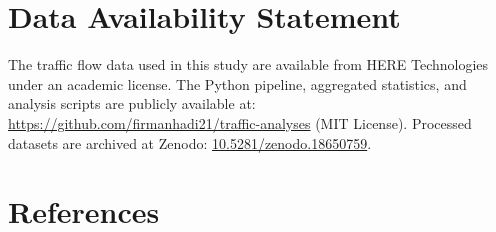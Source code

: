 \documentclass[12pt,a4paper]{article}
\begin{document}
\section{Data Availability Statement}

The traffic flow data used in this study are available from HERE Technologies under an academic license. The Python pipeline, aggregated statistics, and analysis scripts are publicly available at: \url{https://github.com/firmanhadi21/traffic-analyses} (MIT License). Processed datasets are archived at Zenodo: \href{https://doi.org/10.5281/zenodo.18650759}{10.5281/zenodo.18650759}.

\section*{References}
\end{document}
